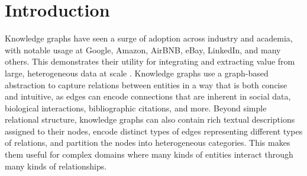 \documentclass{article}
\theoremstyle{plain}
\theoremstyle{definition}
\theoremstyle{remark}
\begin{document}


\begin{abstract}
GraphRAG and structural-embedding methods broadly assume that graph structure carries predictive signal beyond what text alone provides. We test this assumption on PrimeKG, a 129{,}000-node biomedical knowledge graph, using cross-fit double machine learning (DML) to estimate the residual predictive value of structure for link prediction after partialling out a strong text baseline. We use four samplers as probes for distinct structural hypotheses (DeepWalk, node2vec-BFS, node2vec-DFS, GraphSAGE) and four schema-induced subgraphs spanning drug, gene/protein, pathway, disease, and phenotype contexts. Structure adds significant residual signal in all 16 (schema, sampler) combinations, but the magnitude anti-correlates with text-baseline strength. Under schema shift, walk-based samplers transfer universally while GraphSAGE fails, sometimes catastrophically (AUC drops $0.954 \rightarrow 0.768$); when text generalization collapses (text AUC $=0.474$), random-walk embeddings rescue prediction to AUC $\approx 0.93$. Walk-based structural embeddings encode schema-invariant biological primitives; aggregation-based features are schema-specific.
\end{abstract}

\section{Introduction}

Knowledge graphs have seen a surge of adoption across industry and academia, with notable usage at Google, Amazon, AirBNB, eBay, LinkedIn, and many others. This demonstrates their utility for integrating and extracting value from large, heterogeneous data at scale \citep{hogan2021}. Knowledge graphs use a graph-based abstraction to capture relations between entities in a way that is both concise and intuitive, as edges can encode connections that are inherent in social data, biological interactions, bibliographic citations, and more. Beyond simple relational structure, knowledge graphs can also contain rich textual descriptions assigned to their nodes, encode distinct types of edges representing different types of relations, and partition the nodes into heterogeneous categories. This makes them useful for complex domains where many kinds of entities interact through many kinds of relationships.
\end{document}
